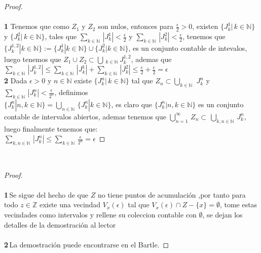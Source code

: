 \documentclass[11pt,letterpaper]{article}
\newcommand{\R}{\mathbb{R}}
\newcommand{\N}{\mathbb{N}}
\newcommand{\Z}{\mathbb{Z}}
\newcommand{\Q}{\mathbb{Q}}
\begin{document}
\begin{proof}\,\\
    \,\\
    \textbf{1}\,\,Tenemos que como $Z_1$ y $Z_2$ son nulos, entonces para $\frac{\epsilon}{2}>0$, existen $\{J^{1}_{k}|\,k\in \N\}$ y $\{J^{2}_{k}|\,k\in \N\}$, tales que
    $\sum_{k\in \N}\,|J^1_{k}|<\frac{\epsilon}{2}$ y $\sum_{k\in \N}\,|J^2_{k}|<\frac{\epsilon}{2}$, tenemos que $\{J^{1,2}_{k}|k\in \N\}:=\{J^1_{k}|k\in \N\}\cup\{J^2_{k}|k\in \N\}$, es un conjunto contable
    de intevalos, luego tenemos que $Z_1\cup Z_2\subset \bigcup\,_{k\in \N}\,J^{1,2}_{k}$, ademas que \\$\sum_{k\in \N}\,|J_k^{1,2}|\leq\sum_{k\in \N}\,|J^1_{k}|+\sum_{k\in \N}\,|J^2_{k}|
    \leq \frac{\epsilon}{2}+\frac{\epsilon}{2}=\epsilon$
    \newpage
    \,\\
    \textbf{2}\,\,Dada $\epsilon>0$ y $n\in \N$ existe $\{J^n_{k}|\,k\in \N\}$ tal que $Z_n\subset\bigcup_{k\in \N}\,\,J^{n}_{k}$ y $\sum_{k\in \N}\,|J^n_{k}|<\frac{\epsilon}{2^n}$, definimos\\
    $\{J^{n}_{k}|n,k\in \N\}=\bigcup_{n\in \N}\,\{J^n_{k}|k\in \N\}$, es claro que $\{J^{n}_{k}|n,k\in \N\}$ es un conjunto contable de intervalos abiertos, ademas tenemos que
    $\bigcup_{n=1}^{\infty}\,Z_n\subset\,\bigcup_{k,n\in \N}\,J^{n}_{k}$, luego finalmente tenemos que:\,\\
    $\sum_{k,n\in \N}\,|J^n_{k}|\leq \sum_{k\in \N}\,\frac{\epsilon}{2^n}=\epsilon$
\end{proof}\,\\
\begin{proof}\,\\
    \,\\
    \textbf{1}\,Se sigue del hecho de que $Z$ no tiene puntos de acumulaci\'on ,por tanto para todo $z\in \Z$ existe una vecindad $V_{x}(\epsilon)$ tal que $V_{x}(\epsilon)\cap Z-\{x\}=\emptyset$, tome estas vecindades como intervalos y rellene su coleccion contable con $\emptyset$, se dejan los detalles
    de la demostraci\'on al lector\,\\
    \,\\
    \textbf{2}\,La demostraci\'on puede encontrarse en el Bartle.
\end{proof}
\end{document}
